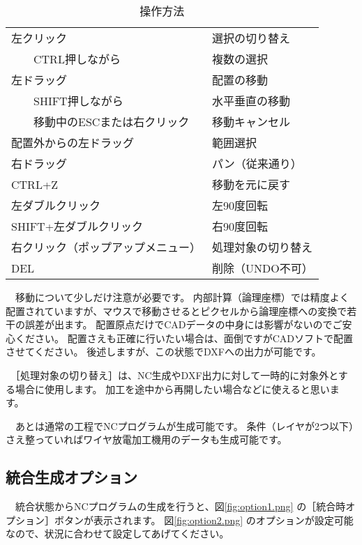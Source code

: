 \begin{table}[H]
\centering
\caption{操作方法}
\label{tab:key}
\begin{tabular}{|l|l|}
\hline
左クリック & 選択の切り替え \\
　　CTRL押しながら & 複数の選択 \\ \hline
左ドラッグ & 配置の移動 \\
　　SHIFT押しながら & 水平垂直の移動 \\
　　移動中のESCまたは右クリック & 移動キャンセル \\ \hline
配置外からの左ドラッグ & 範囲選択 \\ \hline
右ドラッグ & パン（従来通り）\\ \hline
CTRL+Z & 移動を元に戻す \\ \hline
左ダブルクリック & 左90度回転 \\ \hline
SHIFT+左ダブルクリック & 右90度回転 \\ \hline
右クリック（ポップアップメニュー） & 処理対象の切り替え \\ \hline
DEL & 削除（UNDO不可）\\ \hline
\end{tabular}
\end{table}

　移動について少しだけ注意が必要です。
内部計算（論理座標）では精度よく配置されていますが、マウスで移動させるとピクセルから論理座標への変換で若干の誤差が出ます。
配置原点だけでCADデータの中身には影響がないのでご安心ください。
配置さえも正確に行いたい場合は、面倒ですがCADソフトで配置させてください。
後述しますが、この状態でDXFへの出力が可能です。

　［処理対象の切り替え］は、NC生成やDXF出力に対して一時的に対象外とする場合に使用します。
加工を途中から再開したい場合などに使えると思います。


　あとは通常の工程でNCプログラムが生成可能です。
条件（レイヤが2つ以下）さえ整っていればワイヤ放電加工機用のデータも生成可能です。


\subsection{統合生成オプション}
　統合状態からNCプログラムの生成を行うと、図\ref{fig:option1.png} の［統合時オプション］ボタンが表示されます。
図\ref{fig:option2.png} のオプションが設定可能なので、状況に合わせて設定してあげてください。

